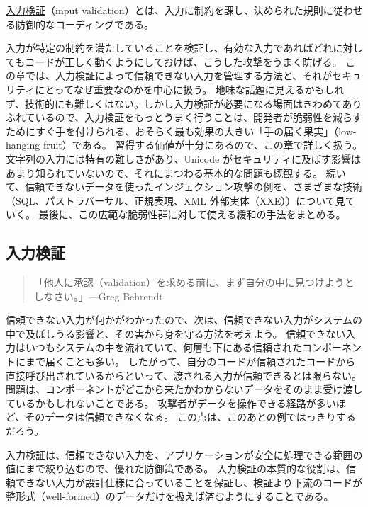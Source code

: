 \documentclass[uplatex]{jsarticle}
\def\label#1{}%
\begin{document}
\begin{dfn}[入力検証]\label{dfn:ch10-input-validation}
\underline{入力検証}（input validation）とは、入力に制約を課し、決められた規則に従わせる防御的なコーディングである。
\end{dfn}

入力が特定の制約を満たしていることを検証し、有効な入力であればどれに対してもコードが正しく動くようにしておけば、こうした攻撃をうまく防げる。
この章では、入力検証によって信頼できない入力を管理する方法と、それがセキュリティにとってなぜ重要なのかを中心に扱う。
地味な話題に見えるかもしれず、技術的にも難しくはない。しかし入力検証が必要になる場面はきわめてありふれているので、入力検証をもっとうまく行うことは、開発者が脆弱性を減らすためにすぐ手を付けられる、おそらく最も効果の大きい「手の届く果実」（low-hanging fruit）である。
習得する価値が十分にあるので、この章で詳しく扱う。
文字列の入力には特有の難しさがあり、Unicode がセキュリティに及ぼす影響はあまり知られていないので、それにまつわる基本的な問題も概観する。
続いて、信頼できないデータを使ったインジェクション攻撃の例を、さまざまな技術（SQL、パストラバーサル、正規表現、XML 外部実体（XXE））について見ていく。
最後に、この広範な脆弱性群に対して使える緩和の手法をまとめる。

\subsection{入力検証}\label{subsec:ch10-input-validation}

\begin{quote}
「他人に承認（validation）を求める前に、まず自分の中に見つけようとしなさい。」---Greg Behrendt
\end{quote}

信頼できない入力が何かがわかったので、次は、信頼できない入力がシステムの中で及ぼしうる影響と、その害から身を守る方法を考えよう。
信頼できない入力はいつもシステムの中を流れていて、何層も下にある信頼されたコンポーネントにまで届くことも多い。
したがって、自分のコードが信頼されたコードから直接呼び出されているからといって、渡される入力が信頼できるとは限らない。
問題は、コンポーネントがどこから来たかわからないデータをそのまま受け渡しているかもしれないことである。
攻撃者がデータを操作できる経路が多いほど、そのデータは信頼できなくなる。
この点は、このあとの例ではっきりするだろう。

入力検証は、信頼できない入力を、アプリケーションが安全に処理できる範囲の値にまで絞り込むので、優れた防御策である。
入力検証の本質的な役割は、信頼できない入力が設計仕様に合っていることを保証し、検証より下流のコードが整形式（well-formed）のデータだけを扱えば済むようにすることである。
\end{document}
